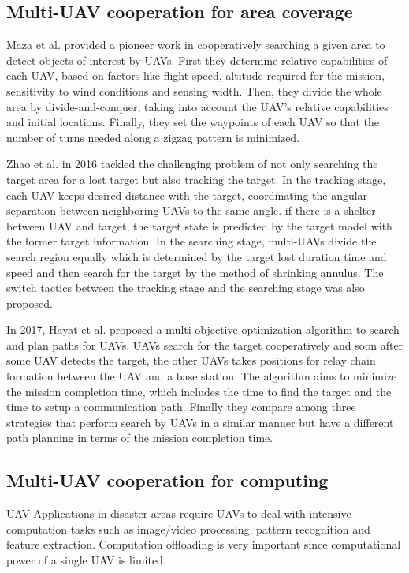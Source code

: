 \documentclass[journal]{IEEEtran}
\begin{document}
\subsection{Multi-UAV cooperation for area coverage}\label{cover}
Maza et al. provided a pioneer work in cooperatively searching a given area to detect objects of interest by UAVs\cite{Maza2007}.
First they determine relative capabilities of each UAV, based on factors like flight speed, altitude required for the mission, sensitivity to wind conditions and sensing width.
Then, they divide the whole area by divide-and-conquer, taking into account the UAV’s relative capabilities and initial locations.
Finally, they set the waypoints of each UAV so that the number of turns needed along a zigzag pattern is minimized.

Zhao et al. in 2016 tackled the challenging problem of not only searching the target area for a lost target but also tracking the target\cite{chang2016}.
In the tracking stage, each UAV keeps desired distance with the target, coordinating the angular separation between neighboring UAVs to the same angle.
if there is a shelter between UAV and target, the target state is predicted by the target model with the former target information.  
In the searching stage, multi-UAVs divide the search region equally which is determined by the target lost duration time and speed and then search for the target by the method of shrinking annulus.
The switch tactics between the tracking stage and the searching stage was also proposed. 

In 2017, Hayat et al. proposed a multi-objective optimization algorithm to search and plan paths for UAVs\cite{Hayat 2017}.
UAVs search for the target cooperatively and soon after some UAV detects the target, the other UAVs takes positions for relay chain formation between the UAV and a base station.
The algorithm aims to minimize the mission completion time, which includes the time to find the target and the time to setup a communication path.
Finally they compare among three strategies that perform search by UAVs in a similar manner but have a different path planning in terms of the mission completion time.

\subsection{Multi-UAV cooperation for computing}\label{compute}
UAV Applications in disaster areas require UAVs to deal with intensive computation tasks such as image/video processing, pattern recognition and feature extraction. 
Computation offloading is very important since computational power of a single UAV is limited.
\end{document}
